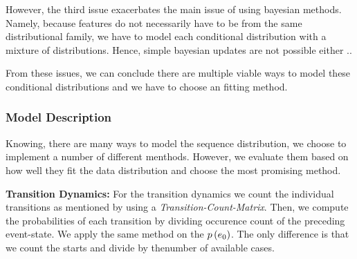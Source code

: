 \documentclass[./../../paper.tex]{subfiles}
\begin{document}
However, the third issue exacerbates the main issue of using bayesian methods. Namely, because features do not necessarily have to be from the same distributional family, we have to model each conditional distribution with a mixture of distributions. Hence, simple bayesian updates are not possible either ..

From these issues, we can conclude there are multiple viable ways to model these conditional distributions and we have to choose an fitting method\footnotemark.  

\subsubsection{Model Description}
Knowing, there are many ways to model the sequence distribution, we choose to implement a number of different menthods. However, we evaluate them based on how well they fit the data distribution and choose the most promising method. 

\noindent\textbf{Transition Dynamics:} For the transition dynamics we count the individual transitions as mentioned by using a \emph{Transition-Count-Matrix}. Then, we compute the probabilities of each transition by dividing occurence count of the preceding event-state. We apply the same method on the $p\left(e_0\right)$. The only difference is that we count the starts and divide by thenumber of available cases. 
\end{document}
